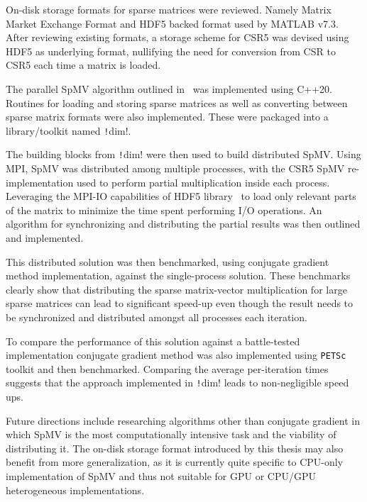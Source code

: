 \documentclass[thesis=M,english]{FITthesis}[2019/12/23]
\newcommand{\csre}[1]{\texttt!#1!}
\begin{document}
On-disk storage formats for sparse matrices were reviewed. Namely Matrix Market Exchange Format
and HDF5 backed format used by MATLAB v7.3. After reviewing existing formats, a storage scheme for CSR5 was 
devised
using HDF5 as underlying format, nullifying the need for conversion from CSR to CSR5 each time a matrix
is loaded.

The parallel SpMV algorithm outlined in~\cite{liu2015csr5} was implemented using C++20. Routines for
loading and storing sparse matrices as well as converting between sparse matrix formats were
also implemented. These were packaged into a library/toolkit named \csre{dim}.

The building blocks from \csre{dim} were then used to build distributed SpMV\@. Using MPI, SpMV was
distributed among multiple processes, with the CSR5 SpMV re-implementation used to perform partial
multiplication inside each process. Leveraging the MPI-IO capabilities of HDF5 library~\cite{hdf5} to load only
relevant parts of the matrix to minimize the time spent performing I/O operations. An algorithm for
synchronizing and distributing the partial results was then outlined and implemented.

This distributed solution was then benchmarked, using conjugate gradient method implementation, against the
single-process solution. These benchmarks clearly show that distributing the sparse matrix-vector multiplication
for large sparse matrices can lead to significant speed-up even though the result needs to be synchronized
and distributed amongst all processes each iteration.

To compare the performance of this solution against a battle-tested implementation conjugate gradient method
was also implemented using \texttt{PETSc} toolkit and then benchmarked. Comparing the average per-iteration times
suggests that the approach implemented in \csre{dim} leads to non-negligible speed ups.

Future directions include researching algorithms other than conjugate gradient in which SpMV is the
most computationally intensive task and the viability of distributing it. The on-disk storage format
introduced by this thesis may also benefit from more generalization, as it is currently quite specific to
CPU-only implementation of SpMV and thus not suitable for GPU or CPU/GPU heterogeneous implementations.





\appendix
\end{document}
